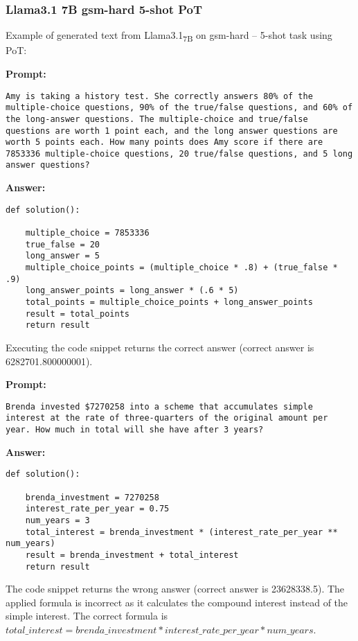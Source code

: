	\subsubsection*{Llama3.1 7B gsm-hard 5-shot PoT}
	\noindent Example of generated text from Llama3.1\textsubscript{7B} on gsm-hard -- 5-shot task using PoT:
	\begin{displayquote}
		\textbf{Prompt:}
		\begin{Verbatim}[fontsize=\small,breaklines]
Amy is taking a history test. She correctly answers 80% of the multiple-choice questions, 90% of the true/false questions, and 60% of the long-answer questions. The multiple-choice and true/false questions are worth 1 point each, and the long answer questions are worth 5 points each. How many points does Amy score if there are 7853336 multiple-choice questions, 20 true/false questions, and 5 long answer questions?
    \end{Verbatim}
		\textbf{Answer:}
		\begin{Verbatim}[fontsize=\small,breaklines]
def solution():

    multiple_choice = 7853336
    true_false = 20
    long_answer = 5
    multiple_choice_points = (multiple_choice * .8) + (true_false * .9)
    long_answer_points = long_answer * (.6 * 5)
    total_points = multiple_choice_points + long_answer_points
    result = total_points
    return result
    \end{Verbatim}
	\end{displayquote}
	Executing the code snippet returns the correct answer (correct answer is 6282701.800000001).
	\begin{displayquote}
		\textbf{Prompt:}
		\begin{Verbatim}[fontsize=\small,breaklines]
Brenda invested $7270258 into a scheme that accumulates simple interest at the rate of three-quarters of the original amount per year. How much in total will she have after 3 years?
    \end{Verbatim}
		\textbf{Answer:}
		\begin{Verbatim}[fontsize=\small,breaklines]
def solution():

    brenda_investment = 7270258
    interest_rate_per_year = 0.75
    num_years = 3
    total_interest = brenda_investment * (interest_rate_per_year ** num_years)
    result = brenda_investment + total_interest
    return result
    \end{Verbatim}
	\end{displayquote}
	The code snippet returns the wrong answer (correct answer is 23628338.5).
	The applied formula is incorrect as it calculates the compound interest instead of the simple interest.
	The correct formula is $total\_interest = brenda\_investment * interest\_rate\_per\_year * num\_years$.